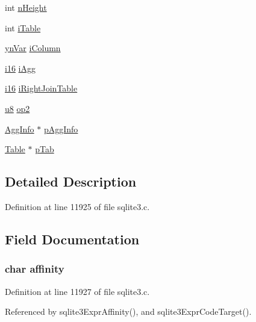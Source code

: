 \begin{DoxyCompactItemize}
\begin{tabbing}
\end{tabbing}\item 
int \hyperlink{struct_expr_a17d981419afeee27eb36a8b43183e49a}{n\+Height}
\item 
int \hyperlink{struct_expr_a3d7171e8cbf2d9cc6743da9da42c8828}{i\+Table}
\item 
\hyperlink{sqlite3_8c_a8f09a8707e1c321e17c3625018c599ce}{yn\+Var} \hyperlink{struct_expr_a3b836549d2b76a569c649c3c4b5869ac}{i\+Column}
\item 
\hyperlink{sqlite3_8c_a7b32340f65cd15f029caad258fb3355c}{i16} \hyperlink{struct_expr_a5ceb8e3b2fe3e0122f95171c07ff629f}{i\+Agg}
\item 
\hyperlink{sqlite3_8c_a7b32340f65cd15f029caad258fb3355c}{i16} \hyperlink{struct_expr_a24802f7e7a6c1cdeb6b25b2bad516888}{i\+Right\+Join\+Table}
\item 
\hyperlink{sqlite3_8c_a74a0f6424ae628af25f23f0a35f6ead3}{u8} \hyperlink{struct_expr_a37d7d563e3849872d9fbdf65c5625d18}{op2}
\item 
\hyperlink{struct_agg_info}{Agg\+Info} $\ast$ \hyperlink{struct_expr_a8d44bec2b506e6b367f1de588dbcae27}{p\+Agg\+Info}
\item 
\hyperlink{struct_table}{Table} $\ast$ \hyperlink{struct_expr_a11b1abc167f386db2ab7fc634c880c26}{p\+Tab}
\end{DoxyCompactItemize}


\subsection{Detailed Description}


Definition at line 11925 of file sqlite3.\+c.



\subsection{Field Documentation}
\hypertarget{struct_expr_a58ce1ac60212fdb49de8a3029209e9e2}{}
\subsubsection[{affinity}]{\setlength{\rightskip}{0pt plus 5cm}char affinity}\label{struct_expr_a58ce1ac60212fdb49de8a3029209e9e2}


Definition at line 11927 of file sqlite3.\+c.



Referenced by sqlite3\+Expr\+Affinity(), and sqlite3\+Expr\+Code\+Target().

